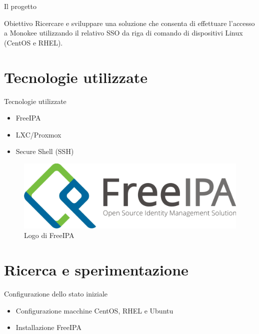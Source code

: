 \documentclass{beamer}
\begin{document}
	\begin{frame}{Il progetto}
		\begin{block}{Obiettivo}
			Ricercare e sviluppare una soluzione che consenta di effettuare l'accesso a Monokee utilizzando il relativo SSO da riga di comando di dispositivi Linux (CentOS e RHEL).
		\end{block}
	\end{frame}

	\section{Tecnologie utilizzate}
	
	\begin{frame}{Tecnologie utilizzate}
				
		\begin{itemize}
			\item FreeIPA \vspace{.5em}
			\item LXC/Proxmox \vspace{.5em}
			\item Secure Shell (SSH) \vspace{.5em}
		\end{itemize}
		
		\begin{figure}[H] 
			\centering 
			\includegraphics[width=0.4\columnwidth]{immagini/logo-freeipa.png} 
			\caption{Logo di FreeIPA}
			\label{fig:freeipa}
		\end{figure}
	\end{frame}

	\section{Ricerca e sperimentazione}
	
	\begin{frame}{Configurazione dello stato iniziale}
				
		\begin{itemize}
			\item Configurazione macchine CentOS, RHEL e Ubuntu \vspace{.5em}
			\item Installazione FreeIPA \vspace{.5em}
		\end{itemize}
		
	\end{frame}
	
\end{document}
